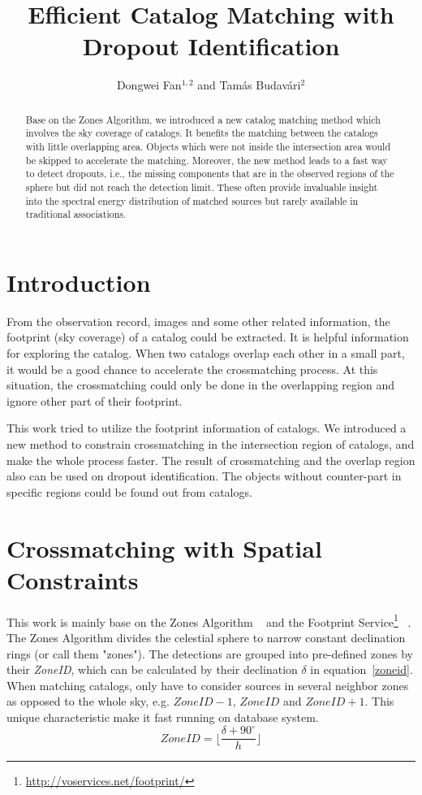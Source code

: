 \documentclass[11pt,twoside]{article}
\begin{document}
\title{Efficient Catalog Matching with Dropout Identification}
\author{Dongwei Fan$^{1,2}$ and Tam\'as Budav\'ari$^2$}

\begin{abstract}
Base on the Zones Algorithm, we introduced a new catalog matching method which involves the sky coverage of catalogs. It benefits the matching between the catalogs with little overlapping area. Objects which were not inside the intersection area would be skipped to accelerate the matching. Moreover, the new method leads to a fast way to detect dropouts, i.e., the missing components that are in the observed regions of the sphere but did not reach the detection limit. These often provide invaluable insight into the spectral energy distribution of matched sources but rarely available in traditional associations.
\end{abstract}

\section{Introduction}
From the observation record, images and some other related information, the footprint (sky coverage) of a catalog could be extracted. It is helpful information for exploring the catalog. When two catalogs overlap each other in a small part, it would be a good chance to accelerate the crossmatching process. At this situation, the crossmatching could only be done in the overlapping region and ignore other part of their footprint.

This work tried to utilize the footprint information of catalogs. We introduced a new method to constrain crossmatching in the intersection region of catalogs, and make the whole process faster. The result of crossmatching and the overlap region also can be used on dropout identification. The objects without counter-part in specific regions could be found out from catalogs.

\section{Crossmatching with Spatial Constraints}
This work is mainly base on the Zones Algorithm ~\citep{DBLP:journals/corr/abs-cs-0701171} and the Footprint Service\footnote{\url{http://voservices.net/footprint/}} ~\citep{2007ASPC..376..559B}. The Zones Algorithm divides the celestial sphere to narrow constant declination rings (or call them "zones"). The detections are grouped into pre-defined zones by their \textit{ZoneID}, which can be calculated by their declination $\delta$ in equation~\ref{zoneid}. When matching catalogs, only have to consider sources in several neighbor zones as opposed to the whole sky, e.g. $ZoneID-1$, $ZoneID$ and $ZoneID+1$. This unique characteristic make it fast running on database system.
\begin{equation}\label{zoneid}
ZoneID=\lfloor{\frac{\delta + 90^\circ}{h}}\rfloor
\end{equation}
\end{document}
